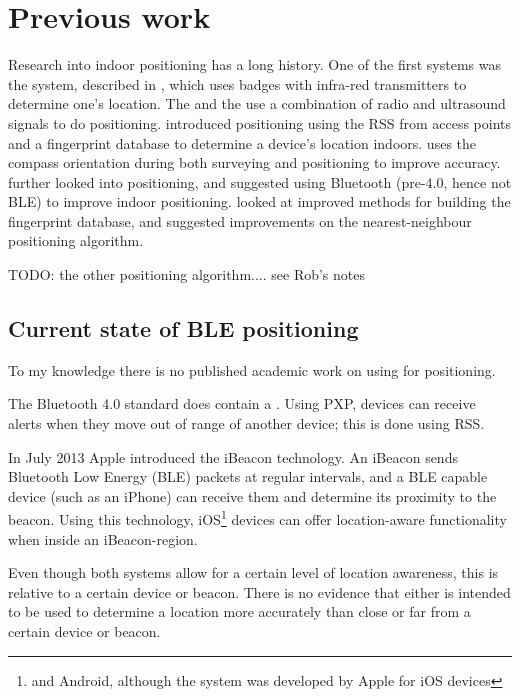 \section{Previous work}
Research into indoor positioning has a long history.
One of the first systems was the  system, described in \citet{want1992active}, which uses badges with infra-red transmitters to determine one's location.
The \citep{harter2002anatomy} and the \citep{priyantha2000cricket} use a combination of radio and ultrasound signals to do positioning.
\citet{bahl2000radar} introduced \wifi positioning using the RSS from \wifi access points and a fingerprint database to determine a device's location indoors.
\citet{king2006compass} uses the compass orientation during both surveying and positioning to improve accuracy.
\citet{castro2001probabilistic} further looked into \wifi positioning, and \citet{pandya2003indoor} suggested using Bluetooth (pre-4.0, hence not BLE) to improve indoor positioning.
\citet{li2005method} looked at improved methods for building the fingerprint database, and \citet{shin2012enhanced} suggested improvements on the nearest-neighbour positioning algorithm.

TODO: the other positioning algorithm.... see Rob's notes

\subsection{Current state of BLE positioning}
To my knowledge there is no published academic work on using \BLE for positioning.

The Bluetooth 4.0 standard does contain a .
Using PXP, devices can receive alerts when they move out of range of another device; this is done using RSS.

In July 2013 Apple introduced the iBeacon technology.
An iBeacon sends Bluetooth Low Energy (BLE) packets at regular intervals, and a BLE capable device (such as an iPhone) can receive them and determine its proximity to the beacon.
Using this technology, iOS\footnote{and Android, although the system was developed by Apple for iOS devices} devices can offer location-aware functionality when inside an iBeacon-region.

Even though both systems allow for a certain level of location awareness, this is relative to a certain device or beacon.
There is no evidence that either is intended to be used to determine a location more accurately than close or far from a certain device or beacon.


